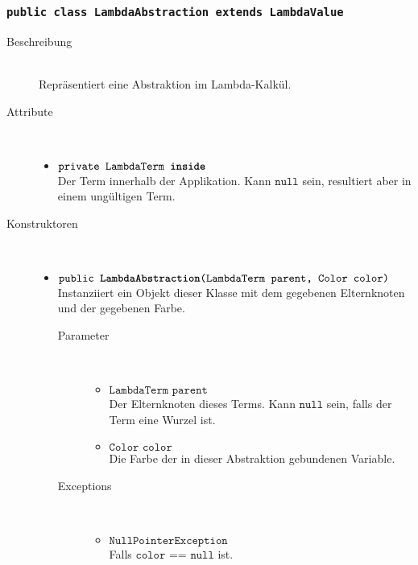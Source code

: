 \subsubsection{\normalfont \texttt{public class \textbf{LambdaAbstraction} extends LambdaValue}}

\begin{description}
\item[Beschreibung] \hfill \\ Repräsentiert eine Abstraktion im Lambda-Kalkül.
\item[Attribute] \hfill \\
	\vspace{-.8cm}
	\begin{itemize}
		\item $\texttt{private LambdaTerm \textbf{inside}}$ \\ Der Term innerhalb der Applikation. Kann $\texttt{null}$ sein, resultiert aber in einem ungültigen Term.
	\end{itemize}
	
\item[Konstruktoren] \hfill \\
	\vspace{-.8cm}
	\begin{itemize}
		\item $\texttt{public \textbf{LambdaAbstraction}(LambdaTerm parent, Color color)}$ \\ Instanziiert ein Objekt dieser Klasse mit dem gegebenen Elternknoten und der gegebenen Farbe.
		\begin{description}
			\item[Parameter] \hfill \\
			\vspace{-.8cm}
			\begin{itemize}
				\item $\texttt{LambdaTerm parent}$ \\ Der Elternknoten dieses Terms. Kann $\texttt{null}$ sein, falls der Term eine Wurzel ist.
				\item $\texttt{Color color}$ \\ Die Farbe der in dieser Abstraktion gebundenen Variable.
			\end{itemize}
			\item[Exceptions] \hfill \\
			\vspace{-.8cm}
			\begin{itemize}
				\item $\texttt{NullPointerException}$ \\ Falls $\texttt{color == null}$ ist.
			\end{itemize}
		\end{description}
	\end{itemize}
	

\end{description}
